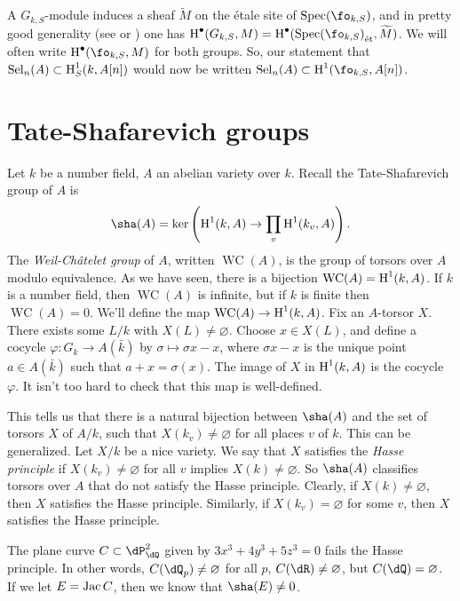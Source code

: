\documentclass{article}
\begin{document}
A $G_{k,S}$-module induces a sheaf $\widetilde M$ on the \'etale site of 
$\spec(\fo_{k,S})$, and in pretty good generality (see \cite{fo11} or 
\cite[II.2.9]{mi06}) one has 
$\h^\bullet(G_{k,S},M) = \h^\bullet(\et{\spec(\fo_{k,S})},\widetilde M)$. We 
will often write $\h^\bullet(\fo_{k,S},M)$ for both groups. So, our statement 
that $\operatorname{Sel}_n(A)\subset \operatorname{H}_S^1(k,A[n])$ would now be written 
$\selmer_n(A)\subset \h^1(\fo_{k,S},A[n])$. 










\section{Tate-Shafarevich groups}

Let $k$ be a number field, $A$ an abelian variety over $k$. Recall the 
Tate-Shafarevich group of $A$ is 
\[
  \sha(A) = \ker\left(\h^1(k,A) \to \prod_v \h^1(k_v,A)\right) \text{.}
\]
The \emph{Weil-Ch\^atelet group} of $A$, written $\operatorname{WC}(A)$, is 
the group of torsors over $A$ modulo equivalence. As we have seen, there is a 
bijection $\operatorname{WC}(A) = \operatorname{H}^1(k,A)$. If $k$ is a number field, then 
$\operatorname{WC}(A)$ is infinite, but if $k$ is finite then 
$\operatorname{WC}(A)=0$. We'll define the map 
$\operatorname{WC}(A)\to \operatorname{H}^1(k,A)$. Fix an $A$-torsor $X$. There exists some 
$L/k$ with $X(L)\ne\varnothing$. Choose $x\in X(L)$, and define a cocycle 
$\varphi:G_k\to A(\bar k)$ by $\sigma\mapsto \sigma x - x$, where 
$\sigma x- x$ is the unique point $a\in A(\bar k)$ such that $a+x=\sigma(x)$. 
The image of $X$ in $\operatorname{H}^1(k,A)$ is the cocycle $\varphi$. It isn't too hard to 
check that this map is well-defined. 

This tells us that there is a natural bijection between $\sha(A)$ and the set 
of torsors $X$ of $A/k$, such that $X(k_v)\ne\varnothing$ for all places $v$ of 
$k$. This can be generalized. Let $X/k$ be a nice variety. We say that $X$ 
satisfies the \emph{Hasse principle} if $X(k_v)\ne\varnothing$ for all $v$ 
implies $X(k)\ne\varnothing$. So $\sha(A)$ classifies torsors over $A$ that 
do not satisfy the Hasse principle. Clearly, if $X(k)\ne\varnothing$, then 
$X$ satisfies the Hasse principle. Similarly, if $X(k_v)=\varnothing$ for some 
$v$, then $X$ satisfies the Hasse principle. 

\begin{example}[Selmer]
The plane curve $C\subset \dP_\dQ^2$ given by $3 x^3+4 y^3+5 z^3=0$ fails the 
Hasse principle. In other words, $C(\dQ_p)\ne \varnothing$ for all $p$, 
$C(\dR)\ne\varnothing$, but $C(\dQ)=\varnothing$. If we let $E=\operatorname{Jac} C$, then 
we know that $\sha(E)\ne 0$. 
\end{example}
\end{document}
